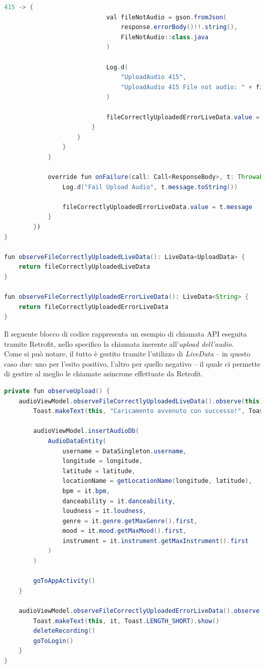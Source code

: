 \documentclass{article}
\begin{document}
\begin{lstlisting}[language = JAVA]
                        415 -> {
                            val fileNotAudio = gson.fromJson(
                                response.errorBody()!!.string(),
                                FileNotAudio::class.java
                            )

                            Log.d(
                                "UploadAudio 415",
                                "UploadAudio 415 File not audio: " + fileNotAudio.detail
                            )

                            fileCorrectlyUploadedErrorLiveData.value = fileNotAudio.detail
                        }
                    }
                }
            }

            override fun onFailure(call: Call<ResponseBody>, t: Throwable) {
                Log.d("Fail Upload Audio", t.message.toString())

                fileCorrectlyUploadedErrorLiveData.value = t.message
            }
        })
}

fun observeFileCorrectlyUploadedLiveData(): LiveData<UploadData> {
    return fileCorrectlyUploadedLiveData
}

fun observeFileCorrectlyUploadedErrorLiveData(): LiveData<String> {
    return fileCorrectlyUploadedErrorLiveData
}
\end{lstlisting}
Il seguente blocco di codice rappresenta un esempio di chiamata API eseguita tramite Retrofit, nello specifico la chiamata inerente all'\textit{upload dell'audio}.\\
Come si può notare, il tutto è gestito tramite l'utilizzo di \textit{LiveData} -- in questo caso due: uno per l'esito positivo, l'altro per quello negativo -- il quale ci permette di gestire al meglio le chiamate asincrone effettuate da Retrofit.
\begin{lstlisting}[language = JAVA]
private fun observeUpload() {
    audioViewModel.observeFileCorrectlyUploadedLiveData().observe(this) {
        Toast.makeText(this, "Caricamento avvenuto con successo!", Toast.LENGTH_SHORT).show()

        audioViewModel.insertAudioDb(
            AudioDataEntity(
                username = DataSingleton.username,
                longitude = longitude,
                latitude = latitude,
                locationName = getLocationName(longitude, latitude),
                bpm = it.bpm,
                danceability = it.danceability,
                loudness = it.loudness,
                genre = it.genre.getMaxGenre().first,
                mood = it.mood.getMaxMood().first,
                instrument = it.instrument.getMaxInstrument().first
            )
        )

        goToAppActivity()
    }

    audioViewModel.observeFileCorrectlyUploadedErrorLiveData().observe(this) {
        Toast.makeText(this, it, Toast.LENGTH_SHORT).show()
        deleteRecording()
        goToLogin()
    }
}
\end{lstlisting}
\end{document}
